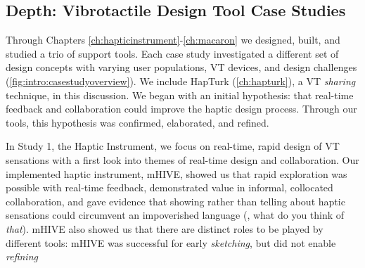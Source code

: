 \subsection{Depth: Vibrotactile Design Tool Case Studies}
Through Chapters \ref{ch:hapticinstrument}-\ref{ch:macaron} we designed, built, and studied a trio of \haxd support tools.
Each case study investigated a different set of design concepts with varying user populations, VT devices, and design challenges (\autoref{fig:intro:casestudyoverview}).
We include HapTurk (\autoref{ch:hapturk}), a VT \emph{sharing} technique, in this discussion.
We began with an initial hypothesis: that real-time feedback and collaboration could improve the haptic design process.
Through our tools, this hypothesis was confirmed, elaborated, and refined.

In Study 1, the Haptic Instrument, we focus on real-time, rapid design of VT sensations with a first look into themes of real-time design and collaboration.
Our implemented haptic instrument, mHIVE, showed us that rapid exploration was possible with real-time feedback, demonstrated value in informal, collocated collaboration, and gave evidence that showing rather than telling about haptic sensations could circumvent an impoverished language (\eg, what do you think of \emph{that}).
 mHIVE also showed us that there are distinct roles to be played by different tools: mHIVE was successful for early \emph{sketching}, but did not enable \emph{refining} %


